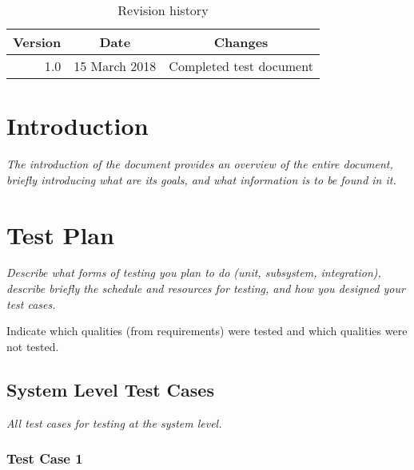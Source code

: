 \documentclass[12pt]{article}
\newcounter{req ID}
\begin{document}
                \begin{table}[htbp]
                    \caption{Revision history}
                    \begin{center}
                        \begin{tabular}{|r | c| c |}
                            \hline
                            Version & Date & Changes \\
                            \hline
                            1.0 & 15 March 2018 & Completed test document \\
                            \hline
                        \end{tabular}
                    \end{center}
                \end{table}


                \tableofcontents
\listoffigures
\clearpage
\listoftables

\clearpage

\section{Introduction}

{\it
The introduction of the document provides an overview of the entire document,
briefly introducing what are its goals, and what information is to be found in it.
}

\section{Test Plan}

{\it
Describe what forms of testing you plan to do (unit, subsystem, integration),
describe briefly the schedule and resources for testing,
and
how you designed your test cases.

Indicate which qualities (from requirements) were tested and which qualities were not tested.
}

\subsection{System Level Test Cases}

{\it
All test cases for testing at the system level.
}

\subsubsection{Test Case 1} \label{tc:1}
\end{document}
